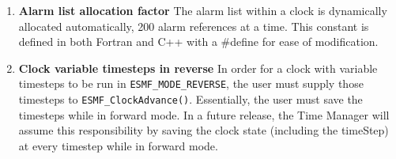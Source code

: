 
\begin{enumerate}

\item {\bf Alarm list allocation factor}  The alarm list within a clock is
dynamically allocated automatically, 200 alarm references at a time.
This constant is defined in both Fortran and C++ with a \#define for ease
of modification.

\item {\bf Clock variable timesteps in reverse} In order for a clock with
variable timesteps to be run in {\tt ESMF\_MODE\_REVERSE}, the user must
supply those timesteps to {\tt ESMF\_ClockAdvance()}.  Essentially, the user
must save the timesteps while in forward mode.  In a future release, the
Time Manager will assume this responsibility by saving the clock state
(including the timeStep) at every timestep while in forward mode.

\end{enumerate}
